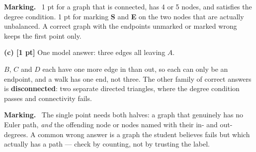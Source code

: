 \documentclass[a4paper, 12pt]{extarticle}
\newenvironment{grading}
  {\begin{tcolorbox}[colback=pltblue!4, colframe=pltblue!35, boxrule=0.5pt,
                     sharp corners, boxsep=2pt, left=6pt, right=6pt,
                     top=4pt, bottom=4pt]\small\textbf{Marking.}\ }
  {\end{tcolorbox}}
\begin{document}
\begin{grading}
1 pt for a graph that is connected, has 4 or 5 nodes, and satisfies the degree
condition. 1 pt for marking \textbf{S} and \textbf{E} on the two nodes that
are actually unbalanced. A correct graph with the endpoints unmarked or marked
wrong keeps the first point only.
\end{grading}

\textbf{(c) [1 pt]} One model answer: three edges all leaving $A$.

\begin{center}
\end{center}

$B$, $C$ and $D$ each have one more edge in than out, so each can only be an
endpoint, and a walk has one end, not three. The other family of correct
answers is \textbf{disconnected}: two separate directed triangles, where the
degree condition passes and connectivity fails.

\begin{grading}
The single point needs both halves: a graph that genuinely has no Euler path,
\emph{and} the offending node or nodes named with their in- and out-degrees. A
common wrong answer is a graph the student believes fails but which actually
has a path --- check by counting, not by trusting the label.
\end{grading}
\end{document}
